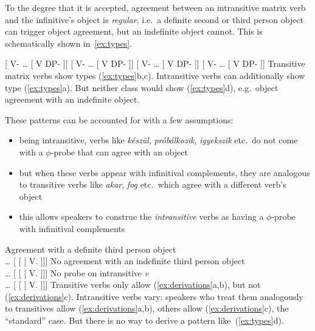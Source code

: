 To the degree that it is accepted, agreement between an intransitive matrix
verb and the infinitive's object is \emph{regular}, i.e.\ a definite second or
third person object can trigger object agreement, but an indefinite object
cannot. This is schematically shown in~\eqref{ex:types}.

\pex\label{ex:types}
    \a 	{}[ V-\Sbj{} \dots{} [\tss{\Inf} V DP-\Def{} ]]\trailingcitation{\faCheck}
    \a 	{}[ V-\Obj{} \dots{} [\tss{\Inf} V DP-\Def{} ]]\trailingcitation{\faCheck}
    \a 	{}[ V-\Sbj{} \dots{} [\tss{\Inf} V DP-\Indef{} ]]\trailingcitation{\faCheck}
    \a 	{}[ V-\Obj{} \dots{} [\tss{\Inf} V DP-\Indef{} ]]\trailingcitation{\faTimes}
\xe
Transitive matrix verbs show types (\ref{ex:types}b,c). Intransitive verbs
can additionally show type (\ref{ex:types}a). But neither class would show
(\ref{ex:types}d), e.g.\ object agreement with an indefinite object.

These patterns can be accounted for with a few assumptions:

\begin{itemize}

    \item 	being intransitive, verbs like \emph{készül}, \emph{próbálkozik},
        \emph{igyekszik} etc.\ do not come with a $\phi$-probe that can agree
        with an \Acc{} object

    \item   but when these verbs appear with infinitival complements, they are
        analogous to transitive verbs like \emph{akar}, \emph{fog} etc.\ which
        agree with a different verb's object

    \item 	this allows speakers to construe the \emph{intransitive}
        verbs as having a $\phi$-probe with infinitival complements

\end{itemize}

\pex[interpartskip=6ex]\label{ex:derivations}
    \a  Agreement with a definite third person object\\
        \dots{} [  [ [ V.\Inf{}  ]]]
    \a  No agreement with an indefinite third person object\\
        \dots{} [  [ [ V.\Inf{}  ]]]
    \a  No probe on intransitive \emph{v}\\
        \dots{} [  [ [ V.\Inf{}  ]]]
\xe
Transitive verbs only allow (\ref{ex:derivations}a,b), but not
(\ref{ex:derivations}c). Intransitive verbs vary: speakers who treat them
analogously to transitives allow (\ref{ex:derivations}a,b), others allow
(\ref{ex:derivations}c), the \enquote{standard} case. But there is no way to
derive a pattern like~(\ref{ex:types}d).

